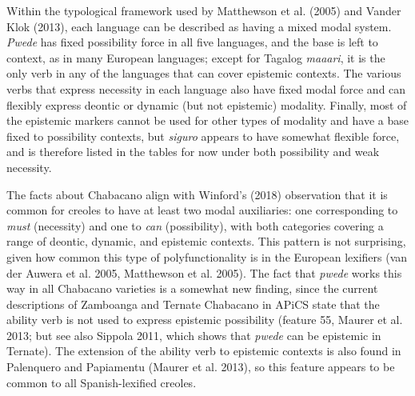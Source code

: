 \begin{styleStandard}
Within the typological framework used by Matthewson et al. (2005) and Vander Klok (2013), each language can be described as having a mixed modal system. \textit{Pwede} has fixed possibility force in all five languages, and the base is left to context, as in many European languages; except for Tagalog \textit{maaari}, it is the only verb in any of the languages that can cover epistemic contexts. The various verbs that express necessity in each language also have fixed modal force and can flexibly express deontic or dynamic (but not epistemic) modality. Finally, most of the epistemic markers cannot be used for other types of modality and have a base fixed to possibility contexts, but \textit{siguro} appears to have somewhat flexible force, and is therefore listed in the tables for now under both possibility and weak necessity. 
\end{styleStandard}

\begin{styleStandard}
The facts about Chabacano align with Winford's (2018) observation that it is common for creoles to have at least two modal auxiliaries: one corresponding to \textit{must }(necessity) and one to \textit{can }(possibility), with both categories covering a range of deontic, dynamic, and epistemic contexts. This pattern is not surprising, given how common this type of polyfunctionality is in the European lexifiers (van der Auwera et al. 2005, Matthewson et al. 2005). The fact that \textit{pwede} works this way in all Chabacano varieties is a somewhat new finding, since the current descriptions of Zamboanga and Ternate Chabacano in APiCS state that the ability verb is not used to express epistemic possibility (feature 55, Maurer et al. 2013; but see also Sippola 2011, which shows that \textit{pwede} can be epistemic in Ternate). The extension of the ability verb to epistemic contexts is also found in Palenquero and Papiamentu (Maurer et al. 2013), so this feature appears to be common to all Spanish-lexified creoles. 
\end{styleStandard}

